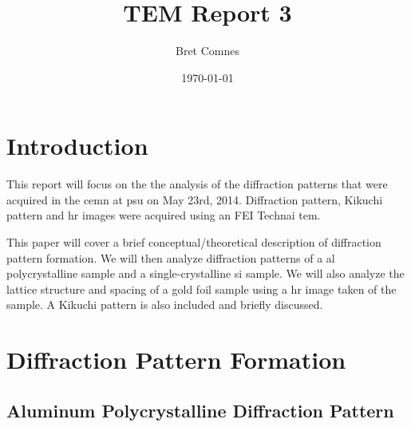\documentclass[12pt,a4paper]{article}
\title{TEM Report 3}
\author{Bret Comnes}
\date{\today}
\begin{document}
\maketitle

\section{Introduction} %

This report will focus on the the analysis of the diffraction patterns that were acquired in the \ac{cemn} at \ac{psu} on May 23rd, 2014.  Diffraction pattern, Kikuchi pattern and \ac{hr} images were acquired using an FEI Technai \ac{tem}.

This paper will cover a brief conceptual/theoretical description of diffraction pattern formation.  We will then analyze diffraction patterns of a \ac{al} polycrystalline sample and a single-crystalline \ac{si} sample.  We will also analyze the lattice structure and spacing of a gold foil sample using a \ac{hr} image taken of the sample.  A Kikuchi pattern is also included and briefly discussed.

\section{Diffraction Pattern Formation} %
\label{sec:diffraction_pattern_formation}

\lipsum[20]


\subsection{Aluminum Polycrystalline Diffraction Pattern} %
\label{sub:poly}

\lipsum[20]
\end{document}
